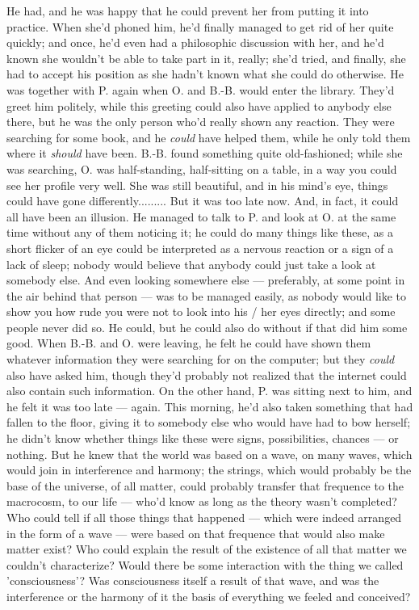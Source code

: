 He had, and he was happy that he could prevent her from putting it into practice. When she'd phoned him, he'd finally managed to get rid of her quite quickly; and once, he'd even had a philosophic discussion with her, and he'd known she wouldn't be able to take part in it, really; she'd tried, and finally, she had to accept his position as she hadn't known what she could do otherwise. 
He was together with P. again when O. and B.-B. would enter the library. They'd greet him politely, while this greeting could also have applied to anybody else there, but he was the only person who'd really shown any reaction. They were searching for some book, and he \emph{could} have helped them, while he only told them where it \emph{should} have been. B.-B. found something quite old-fashioned; while she was searching, O. was half-standing, half-sitting on a table, in a way you could see her profile very well. She was still beautiful, and in his mind's eye, things could have gone differently.........
But it was too late now. And, in fact, it could all have been an illusion. He managed to talk to P. and look at O. at the same time without any of them noticing it; he could do many things like these, as a short flicker of an eye could be interpreted as a nervous reaction or a sign of a lack of sleep; nobody would believe that anybody could just take a look at somebody else. And even looking somewhere else --- preferably, at some point in the air behind that person --- was to be managed easily, as nobody would like to show you how rude you were not to look into his / her eyes directly; and some people never did so. He could, but he could also do without if that did him some good. 
When B.-B. and O. were leaving, he felt he could have shown them whatever information they were searching for on the computer; but they \emph{could} also have asked him, though they'd probably not realized that the internet could also contain such information. On the other hand, P. was sitting next to him, and he felt it was too late --- again. This morning, he'd also taken something that had fallen to the floor, giving it to somebody else who would have had to bow herself; he didn't know whether things like these were signs, possibilities, chances --- or nothing. 
But he knew that the world was based on a wave, on many waves, which would join in interference and harmony; the strings, which would probably be the base of the universe, of all matter, could probably transfer that frequence to the macrocosm, to our life --- who'd know as long as the theory wasn't completed? Who could tell if all those things that happened --- which were indeed arranged in the form of a wave --- were based on that frequence that would also make matter exist? Who could explain the result of the existence of all that matter we couldn't characterize? Would there be some interaction with the thing we called 'consciousness'? Was consciousness itself a result of that wave, and was the interference or the harmony of it the basis of everything we feeled and conceived?

